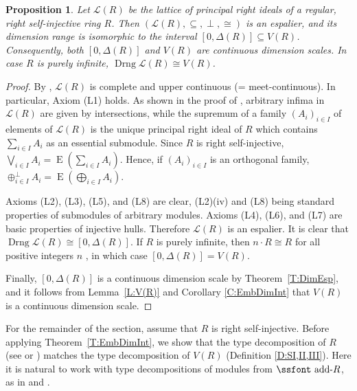 \documentclass[psamsfonts,reqno]{memo-l}
\theoremstyle{plain}
\newtheorem{proposition}[lemma]{Proposition}
\theoremstyle{definition}
\theoremstyle{remark}
\numberwithin{equation}{section}
\DeclareMathOperator{\rE}{E}
\DeclareMathOperator{\Drng}{Drng}
\newcommand{\famm}[2]{(#1)_{#2}}
\newcommand{\Lat}{\mathcal{L}}
\newcommand{\addR}{\mbox{\ssfont add-}R}
\begin{document}
\begin{proposition}\label{P:L(R)}
Let $\Lat(R)$ be the lattice of principal right ideals of a
regular, right self-injective ring
%
$R$. Then
$(\Lat(R),{\subseteq},{\perp},{\cong})$ is an espalier, and
its dimension range is isomorphic to the
interval
$[0,\Delta(R)] \subseteq V(R)$. Consequently, both $[0,\Delta(R)]$ and
$V(R)$ are continuous dimension scales. In case $R$ is
purely infinite,\index{Dzzrng@$\Drng L$}
$\Drng\Lat(R)\cong V(R)$.
\end{proposition}

\begin{proof}
By \cite[Corollary 13.5]{GvnRR}, $\Lat(R)$ is
complete and upper continuous (= meet-continuous). In particular,
Axiom (L1) holds. As shown in the proof of
\cite[Proposition~13.3]{GvnRR}, arbitrary infima in
$\Lat(R)$ are given by intersections, while the supremum of a family
$\famm{A_i}{i\in I}$ of elements of $\Lat(R)$ is the unique principal right
ideal of $R$ which contains $\sum_{i\in I} A_i$ as an essential submodule.
Since $R$ is right self-injective,\index{ErzzE@$\rE(M)$}
$\bigvee_{i\in I}A_i=\rE(\sum_{i\in I} A_i)$. Hence, if $\famm{A_i}{i\in I}$
is an orthogonal family,
$\oplus^\perp_{i\in I}A_i=\rE(\bigoplus_{i\in I}A_i)$.

Axioms (L2), (L3), (L5), and (L8) are clear, (L2)(iv) and (L8)
being standard properties of submodules of arbitrary modules.
Axioms (L4), (L6), and (L7) are basic properties of
injective hulls. Therefore $\Lat(R)$ is an espalier. It is
clear that\index{Dzzrng@$\Drng L$}
$\Drng\Lat(R)\cong[0,\Delta(R)]$. If $R$ is purely infinite, then
$n\cdot R\cong R$ for all positive integers $n$
\cite[Theorem~10.16]{GvnRR}, in which
case $[0,\Delta(R)]= V(R)$.

Finally, $[0,\Delta(R)]$ is a continuous dimension scale
by Theorem~\ref{T:DimEsp}, and it follows from Lemma~\ref{L:V(R)} and
Corollary \ref{C:EmbDimInt} that
$V(R)$ is a continuous dimension scale.
\end{proof}

For the remainder of the section, assume that $R$ is right
self-injective. Before applying Theorem~\ref{T:EmbDimInt}, we show
that the type decomposition of $R$ (see \cite[Chapter VII]{GoBo} or
\cite[Chapter 10]{GvnRR})
matches the type decomposition of
$V(R)$ (Definition \ref{D:SI,II,III}). Here it is
natural to work with type decompositions of modules from $\addR$, as in
\cite[Theorem~7.2]{GoBo} and
\cite[Theorem~10.31]{GvnRR}.
\end{document}
